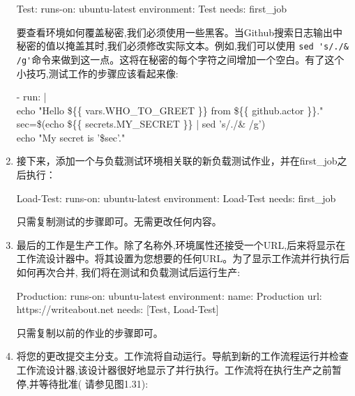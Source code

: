 \begin{enumerate}
\begin{shell}
Test:
  runs-on: ubuntu-latest
  environment: Test
  needs: first_job
\end{shell}

要查看环境如何覆盖秘密,我们必须使用一些黑客。当Github搜索日志输出中秘密的值以掩盖其时,我们必须修改实际文本。例如,我们可以使用 \verb|sed 's/./& /g'|命令来做到这一点。这将在秘密的每个字符之间增加一个空白。有了这个小技巧,测试工作的步骤应该看起来像:

\begin{tcolorbox}[ breakable,colback = bashcodebg, colframe= black!50!white]
\scriptsize{
- run: | \\
\hspace*{2em}echo "Hello \$\{\{ vars.WHO\_TO\_GREET \}\}  from \$\{\{ github.actor \}\}." \\
\hspace*{2em}sec=\$(echo \$\{\{ secrets.MY\_SECRET \}\} | sed 's/./\& /g') \\
\hspace*{2em}echo "My secret is  '\$sec'."
}
\end{tcolorbox}

\item 
接下来，添加一个与负载测试环境相关联的新负载测试作业，并在first\_job之后执行：

\begin{shell}
Load-Test:
  runs-on: ubuntu-latest
  environment: Load-Test
  needs: first_job
\end{shell}

只需复制测试的步骤即可。无需更改任何内容。

\item 
最后的工作是生产工作。除了名称外,环境属性还接受一个URL,后来将显示在工作流设计器中。将其设置为您想要的任何URL。为了显示工作流并行执行后如何再次合并, 我们将在测试和负载测试后运行生产:

\begin{shell}
Production:
  runs-on: ubuntu-latest
  environment:
    name: Production
    url: https://writeabout.net
  needs: [Test, Load-Test]
\end{shell}

只需复制以前的作业的步骤即可。

\item 
将您的更改提交主分支。工作流将自动运行。导航到新的工作流程运行并检查工作流设计器,该设计器很好地显示了并行执行。工作流将在执行生产之前暂停,并等待批准( 请参见图1.31):



\end{enumerate}

